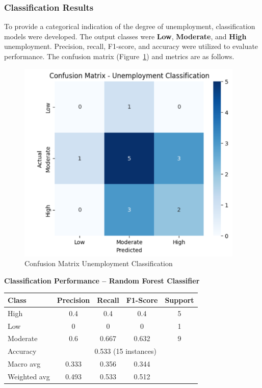\documentclass[conference]{IEEEtran}
\begin{document}
\subsubsection*{Classification Results}
To provide a categorical indication of the degree of unemployment, classification models were developed. The output classes were \textbf{Low}, \textbf{Moderate}, and \textbf{High} unemployment. Precision, recall, F1-score, and accuracy were utilized to evaluate performance. The confusion matrix (Figure~\ref{fig:confusion_matrix}) and metrics are as follows.

\begin{figure}[htbp]
    \centering
    \includegraphics[width=0.85\linewidth]{confusion_matrix.png}
    \caption{Confusion Matrix Unemployment Classification}
    \label{fig:confusion_matrix}
\end{figure}

\textbf{Classification Performance -- Random Forest Classifier}
\begin{table}[htbp]
    \centering
    \begin{tabular}{lcccc}
        \toprule
        Class & Precision & Recall & F1-Score & Support \\
        \midrule
        High & 0.4 & 0.4 & 0.4 & 5 \\
        Low & 0 & 0 & 0 & 1 \\
        Moderate & 0.6 & 0.667 & 0.632 & 9 \\
        \midrule
        Accuracy & \multicolumn{4}{c}{0.533 (15 instances)} \\
        Macro avg & 0.333 & 0.356 & 0.344 & \\
        Weighted avg & 0.493 & 0.533 & 0.512 & \\
        \bottomrule
    \end{tabular}
\end{table}
\end{document}
